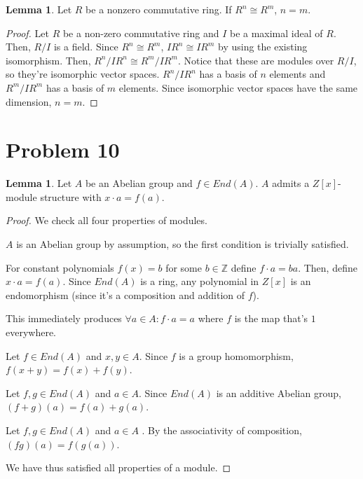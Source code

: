 \documentclass{article}
\theoremstyle{definition}
\newtheorem{lemma}[theorem]{Lemma}
\begin{document}
\begin{lemma}
    Let $R$ be a nonzero commutative ring. If $R^{n} \cong R^{m}$, $n = m$. 
\end{lemma}
\begin{proof}
    Let $R$ be a non-zero commutative ring and $I$ be a maximal ideal of $R$. Then, $R/I$ is a field. Since $R^{n} \cong R^{m}$, $IR^{n} \cong IR^{m}$ by using the existing isomorphism. Then, $R^{n}/IR^{n} \cong R^{m}/IR^{m}$. Notice that these are modules over $R/I$, so they're isomorphic vector spaces. $R^{n}/IR^{n}$ has a basis of $n$ elements and $R^{m}/IR^{m}$ has a basis of $m$ elements. Since isomorphic vector spaces have the same dimension, $n = m$.
\end{proof}


\section{Problem 10}

\begin{lemma}
    Let $A$ be an Abelian group and $f \in End(A)$. $A$ admits a $Z[x]$-module structure with $x \cdot a = f(a)$.
\end{lemma}
\begin{proof}
    We check all four properties of modules.

    $A$ is an Abelian group by assumption, so the first condition is trivially satisfied.

    For constant polynomials $f(x) = b$ for some $b \in \mathbb{Z}$ define $f \cdot a = ba$. Then, define $x \cdot a = f(a)$. Since $End(A)$ is a ring, any polynomial in $Z[x]$ is an endomorphism (since it's a composition and addition of $f$).

    This immediately produces $\forall a \in A: f \cdot a = a$ where $f$ is the map that's $1$ everywhere.

    Let $f \in End(A)$ and $x,y \in A$.
    Since $f$ is a group homomorphism, $f(x+y) = f(x) + f(y)$.

    Let $f,g \in End(A)$ and $a \in A$.
    Since $End(A)$ is an additive Abelian group, $(f+g)(a) = f(a) + g(a)$.

    Let $f,g \in End(A)$ and $a \in A$ . By the associativity of composition, $(fg)(a) = f(g(a))$.

    We have thus satisfied all properties of a module.
\end{proof}
\end{document}

